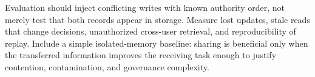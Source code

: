 Evaluation should inject conflicting writes with known authority order, not merely test that both records appear in storage. Measure lost updates, stale reads that change decisions, unauthorized cross-user retrieval, and reproducibility of replay. Include a simple isolated-memory baseline: sharing is beneficial only when the transferred information improves the receiving task enough to justify contention, contamination, and governance complexity.


